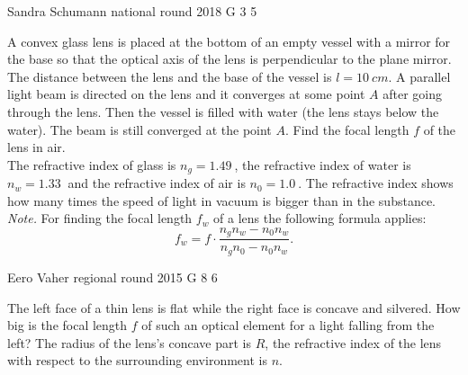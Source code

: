 \documentclass[11pt]{article}
\begin{document}
{Sandra Schumann} %
{national round} %
{2018} %
{G 3} %
{5} %
{

\ifEngStatement
A convex glass lens is placed at the bottom of an empty vessel with a mirror for the base so that the optical axis of the lens is perpendicular to the plane mirror. The distance between the lens and the base of the vessel is $l=\SI{10}{cm}$. A parallel light beam is directed on the lens and it converges at some point $A$ after going through the lens. Then the vessel is filled with water (the lens stays below the water). The beam is still converged at the point $A$. Find the focal length $f$ of the lens in air. \\
The refractive index of glass is $n_g = \SI{1,49}{}$, the refractive index of water is $n_w = \SI{1,33}{}$ and the refractive index of air is $n_0 = \SI{1,0}{}$. The refractive index shows how many times the speed of light in vacuum is bigger than in the substance. \\
\emph{Note.} For finding the focal length $f_w$ of a lens the following formula applies:
\[ f_w = f\cdot\frac{n_g n_w - n_0 n_w}{n_g n_0 - n_0 n_w}. \]
\fi
}

{Eero Vaher} %
{regional round} %
{2015} %
{G 8} %
{6} %
{

\ifEngStatement
The left face of a thin lens is flat while the right face is concave and silvered. How big is the focal length $f$ of such an optical element for a light falling from the left? The radius of the lens’s concave part is $R$, the refractive index of the lens with respect to the surrounding environment is $n$.
\begin{center}
\end{center}
\fi
}
\end{document}
